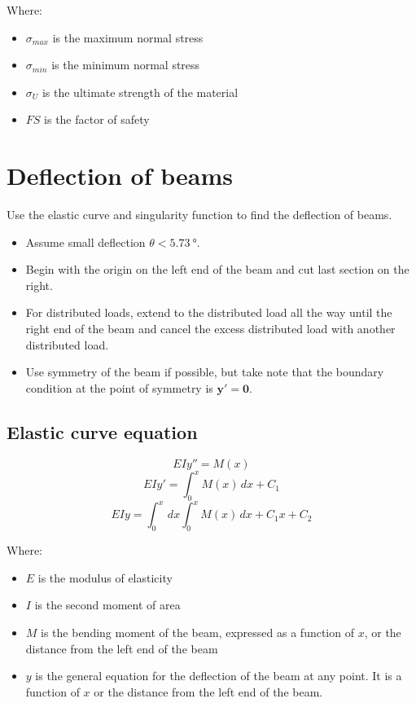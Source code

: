 \documentclass[11pt]{article}
\begin{document}
Where:
\begin{itemize}
\item \(\sigma_{max}\) is the maximum normal stress
\item \(\sigma_{min}\) is the minimum normal stress
\item \(\sigma_U\) is the ultimate strength of the material
\item \(FS\) is the factor of safety
\end{itemize}

\newpage

\section{Deflection of beams}
\label{sec:org6235329}
Use the elastic curve and singularity function to find the deflection of beams.
\begin{itemize}
\item Assume small deflection \(\theta < \qty{5.73}{\degree}\).
\item Begin with the origin on the left end of the beam and cut last section on the right.
\item For distributed loads, extend to the distributed load all the way until the right end of the beam and cancel the excess distributed load with another distributed load.
\item Use symmetry of the beam if possible, but take note that the boundary condition at the point of symmetry is \(\boldsymbol{y' = 0}\).
\end{itemize}

\subsection{Elastic curve equation}
\label{sec:org01bbff8}
\[EIy'' = M(x)\]
\[EIy' = \int_0^x M(x) \, dx + C_1\]
\[EIy = \int_0^x \, dx \int_0^x M(x) \, dx + C_1 x + C_2\]

Where:
\begin{itemize}
\item \(E\) is the modulus of elasticity
\item \(I\) is the second moment of area
\item \(M\) is the bending moment of the beam, expressed as a function of \(x\), or the distance from the left end of the beam
\item \(y\) is the general equation for the deflection of the beam at any point. It is a function of \(x\) or the distance from the left end of the beam.
\end{itemize}
\end{document}
